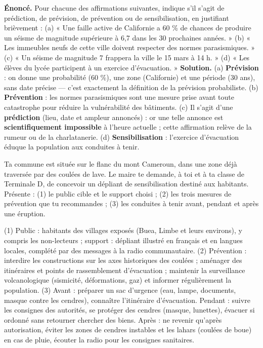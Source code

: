 \documentclass[11pt]{article}
\begin{document}
\begin{exoresolu}
\textbf{Énoncé.} Pour chacune des affirmations suivantes, indique s'il s'agit de prédiction, de prévision, de prévention ou de sensibilisation, en justifiant brièvement : (a) « Une faille active de Californie a 60 \% de chances de produire un séisme de magnitude supérieure à 6,7 dans les 30 prochaines années. » (b) « Les immeubles neufs de cette ville doivent respecter des normes parasismiques. » (c) « Un séisme de magnitude 7 frappera la ville le 15 mars à 14 h. » (d) « Les élèves du lycée participent à un exercice d'évacuation. »
\tcblower
\textbf{Solution.} (a) \textbf{Prévision} : on donne une probabilité (60 \%), une zone (Californie) et une période (30 ans), sans date précise — c'est exactement la définition de la prévision probabiliste. (b) \textbf{Prévention} : les normes parasismiques sont une mesure prise avant toute catastrophe pour réduire la vulnérabilité des bâtiments. (c) Il s'agit d'une \textbf{prédiction} (lieu, date et ampleur annoncés) : or une telle annonce est \textbf{scientifiquement impossible} à l'heure actuelle ; cette affirmation relève de la rumeur ou de la charlatanerie. (d) \textbf{Sensibilisation} : l'exercice d'évacuation éduque la population aux conduites à tenir.
\end{exoresolu}

\begin{exercice}
Ta commune est située sur le flanc du mont Cameroun, dans une zone déjà traversée par des coulées de lave. Le maire te demande, à toi et à ta classe de Terminale D, de concevoir un dépliant de sensibilisation destiné aux habitants. Présente : (1) le public cible et le support choisi ; (2) les trois mesures de prévention que tu recommandes ; (3) les conduites à tenir avant, pendant et après une éruption.
\end{exercice}

\begin{corrige}
(1) Public : habitants des villages exposés (Buea, Limbe et leurs environs), y compris les non-lecteurs ; support : dépliant illustré en français et en langues locales, complété par des messages à la radio communautaire. (2) Prévention : interdire les constructions sur les axes historiques des coulées ; aménager des itinéraires et points de rassemblement d'évacuation ; maintenir la surveillance volcanologique (sismicité, déformations, gaz) et informer régulièrement la population. (3) Avant : préparer un sac d'urgence (eau, lampe, documents, masque contre les cendres), connaître l'itinéraire d'évacuation. Pendant : suivre les consignes des autorités, se protéger des cendres (masque, lunettes), évacuer si ordonné sans retourner chercher des biens. Après : ne revenir qu'après autorisation, éviter les zones de cendres instables et les lahars (coulées de boue) en cas de pluie, écouter la radio pour les consignes sanitaires.
\end{corrige}
\end{document}

